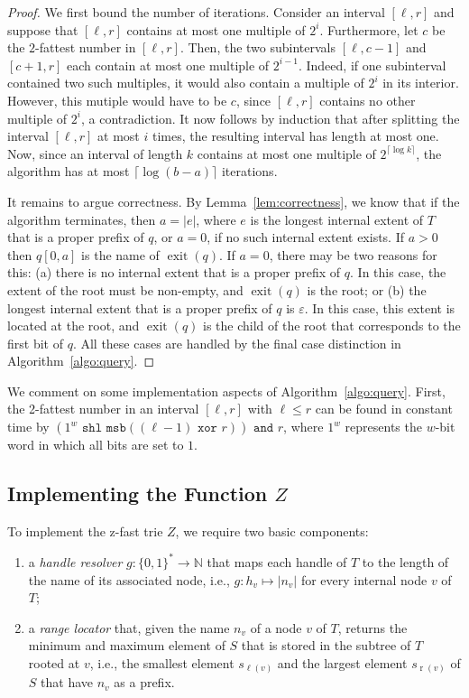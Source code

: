 \documentclass[a4paper,11pt]{article}
\newcommand{\eps}{\varepsilon}
\newcommand{\N}{\mathbb{N}}
\newcommand{\?}{\mskip1.5mu}
\DeclareMathOperator{\exit}{exit}
\DeclareMathOperator{\lrange}{\ell}
\DeclareMathOperator{\rrange}{r}
\begin{document}
\begin{proof}
We first bound the number of iterations. Consider
an interval $[\ell, r]$ and suppose that
$[\ell, r]$ contains at most one multiple
of $2^i$. Furthermore, let $c$ be the 
$2$-fattest number in $[\ell, r]$.
Then, the two subintervals $[\ell, c - 1]$ and 
$[c + 1, r]$ each contain at most one multiple 
of $2^{i-1}$. Indeed, if one subinterval 
contained two such multiples, it would also 
contain a multiple of $2^i$ in its interior. 
However, this mutiple would have to be $c$, 
since $[\ell, r]$ contains no other multiple 
of $2^i$, a contradiction. It now follows 
by induction that after splitting the 
interval $[\ell, r]$ at most $i$ times, the 
resulting interval has length at most one. 
Now, since an interval of length $k$ contains at most one multiple of 
$2^{\lceil\log k\rceil}$, the algorithm
has at most $\lceil\log(b-a)\rceil$ iterations.

It remains to argue correctness. 
By Lemma~\ref{lem:correctness}, we know
that if the algorithm terminates, then
$a = |e|$, where $e$ is the longest internal
extent of $T$ that is a proper prefix of $q$,
or $a = 0$, if no such internal extent exists. If $a > 0$ 
then $q[0, a]$ is the name of $\exit(q)$.
If $a = 0$, there may be two 
reasons for this: (a) there is no internal
extent that is a proper prefix of $q$. In this case,
the extent of the root must be non-empty, and
$\exit(q)$ is the root; or (b) the longest internal
extent that is a proper prefix of $q$ is $\eps$.
In this case, this extent is located at the root, and 
$\exit(q)$ is the child of the root
that corresponds to the first bit
of $q$.
All these cases are handled by the
final case distinction in Algorithm~\ref{algo:query}.
\end{proof}

We comment on some implementation aspects of 
Algorithm~\ref{algo:query}.
First, the 2-fattest
number in an interval $[\ell, r]$ with $\ell \leq r$
can be found in constant time by 
$(1^w \texttt{ shl } 
\texttt{msb}((\ell - 1) \texttt{ xor } r)) \texttt{ and } r$,
where $1^w$ represents the $w$-bit word in which all bits
are set to $1$. 


\subsection{Implementing the Function $Z$}

To implement the z-fast trie $Z$, we require two
basic components:
\begin{enumerate}
  \item a \emph{handle resolver} $g: \{0,1\}^* \rightarrow \N$ that 
    maps each handle of $T$ to the length of the name of its associated 
    node, i.e., $g: h_v \mapsto |n_v|$ for every internal node $v$ 
    of $T$;
  \item a \emph{range locator} that, given the 
  name $n_v$ of a node $v$ of $T$, returns the minimum and
  maximum element of $S$ that is stored in the subtree of $T$
  rooted at $v$, i.e., the smallest element $s_{\lrange(v)}$ and the 
  largest element $s_{\rrange(v)}$ of $S$ that
  have $n_v$ as a prefix.
\end{enumerate}
\end{document}
